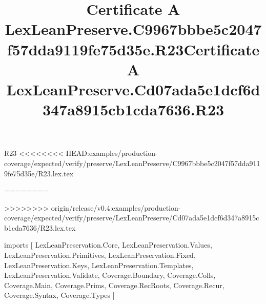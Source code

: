 \begin{lexlean}{R23}
<<<<<<<< HEAD:examples/production-coverage/expected/verify/preserve/LexLeanPreserve/C9967bbbe5c2047f57dda9119fe75d35e/R23.lex.tex
\title{Certificate A LexLeanPreserve.C9967bbbe5c2047f57dda9119fe75d35e.R23}
========
\title{Certificate A LexLeanPreserve.Cd07ada5e1dcf6d347a8915cb1cda7636.R23}
>>>>>>>> origin/release/v0.4:examples/production-coverage/expected/verify/preserve/LexLeanPreserve/Cd07ada5e1dcf6d347a8915cb1cda7636/R23.lex.tex
\begin{coremodule}
imports [
  LexLeanPreservation.Core,
  LexLeanPreservation.Values,
  LexLeanPreservation.Primitives,
  LexLeanPreservation.Fixed,
  LexLeanPreservation.Keys,
  LexLeanPreservation.Templates,
  LexLeanPreservation.Validate,
  Coverage.Boundary,
  Coverage.Colls,
  Coverage.Main,
  Coverage.Prims,
  Coverage.RecRoots,
  Coverage.Recur,
  Coverage.Syntax,
  Coverage.Types
]


\end{coremodule}
\end{lexlean}
